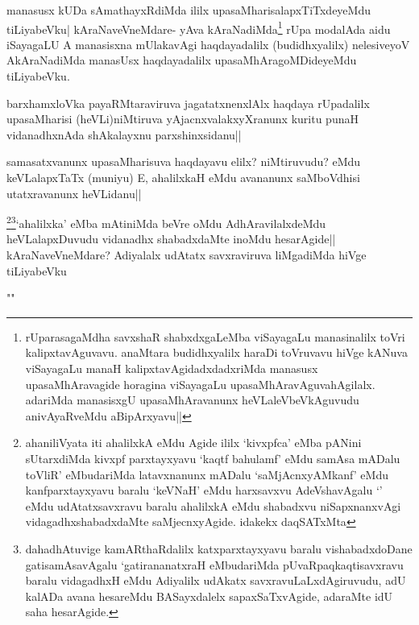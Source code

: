 \begin{artha}
manasusx kUDa sAmathayxRdiMda ililx upasaMharisalapxTiTxdeyeMdu tiLiyabeVku| kAraNaveVneMdare- yAva kAraNadiMda\footnote[2]{rUparasagaMdha savxshaR shabxdxgaLeMba viSayagaLu manasinalilx toVri kalipxtavAguvavu. anaMtara budidhxyalilx haraDi toVruvavu hiVge kANuva viSayagaLu manaH kalipxtavAgidadxdadxriMda manasusx upasaMhAravagide horagina viSayagaLu upasaMhAravAguvahAgilalx. adariMda manasisxgU upasaMhAravanunx heVLaleVbeVkAguvudu anivAyaRveMdu aBipArxyavu||} rUpa modalAda aidu iSayagaLU A manasisxna mUlakavAgi haqdayadalilx (budidhxyalilx) nelesiveyoV AkAraNadiMda manasUsx haqdayadalilx upasaMhAragoMDideyeMdu tiLiyabeVku.
\end{artha}%

\begin{artha}
barxhamxloVka payaRMtaraviruva jagatatxnenxlAlx haqdaya rUpadalilx upasaMharisi (heVLi)niMtiruva yAjacnxvalakxyXranunx kuritu punaH vidanadhxnAda shAkalayxnu parxshinxsidanu||
\end{artha}

\begin{artha}
samasatxvanunx upasaMharisuva haqdayavu elilx? niMtiruvudu? eMdu keVLalapxTaTx (muniyu) E, ahalilxkaH eMdu avananunx saMboVdhisi utatxravanunx heVLidanu||
\end{artha}

\begin{artha}
\footnote[1]{ahaniliVyata iti ahalilxkA eMdu Agide ililx `kivxpfca' eMba pANini sUtarxdiMda kivxpf parxtayxyavu `kaqtf bahulamf' eMdu samAsa mADalu toVliR' eMbudariMda latavxnanunx mADalu `saMjAcnxyAMkanf' eMdu kanfparxtayxyavu baralu `keV\s NaH' eMdu harxsavxvu AdeVshavAgalu `\stext ' eMdu udAtatxsavxravu baralu ahalilxkA eMdu shabadxvu niSapxnanxvAgi vidagadhxshabadxdaMte saMjecnxyAgide. idakekx daqSATxMta}\footnote[2]{dahadhAtuvige kamARthaRdalilx katxparxtayxyavu baralu vishabadxdoDane gatisamAsavAgalu `gatirananatxraH eMbudariMda pUvaRpaqkaqtisavxravu baralu vidagadhxH eMdu Adiyalilx udAkatx savxravuLaLxdAgiruvudu, adU kalADa avana hesareMdu BASayxdalelx sapaxSaTxvAgide, adaraMte idU saha hesarAgide.}`ahalilxka' eMba mAtiniMda beVre oMdu AdhAravilalxdeMdu heVLalapxDuvudu vidanadhx shabadxdaMte inoMdu hesarAgide|| kAraNaveVneMdare? Adiyalalx udAtatx savxraviruva liMgadiMda hiVge tiLiyabeVku
\end{artha}

"\stext "


